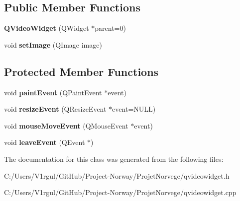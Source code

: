 \subsection*{Public Member Functions}
\begin{DoxyCompactItemize}
\item 
\hypertarget{class_q_video_widget_a9556e8daac0717d705ac8c2fd7e4e2a2}{{\bfseries Q\-Video\-Widget} (Q\-Widget $\ast$parent=0)}\label{class_q_video_widget_a9556e8daac0717d705ac8c2fd7e4e2a2}

\item 
\hypertarget{class_q_video_widget_a331955ccf1e82259702db3fc15983eff}{void {\bfseries set\-Image} (Q\-Image image)}\label{class_q_video_widget_a331955ccf1e82259702db3fc15983eff}

\end{DoxyCompactItemize}
\subsection*{Protected Member Functions}
\begin{DoxyCompactItemize}
\item 
\hypertarget{class_q_video_widget_afa241c4f57f7198f4625b9ac42fbaa79}{void {\bfseries paint\-Event} (Q\-Paint\-Event $\ast$event)}\label{class_q_video_widget_afa241c4f57f7198f4625b9ac42fbaa79}

\item 
\hypertarget{class_q_video_widget_a935858a83ef55740c9424870dc652962}{void {\bfseries resize\-Event} (Q\-Resize\-Event $\ast$event=N\-U\-L\-L)}\label{class_q_video_widget_a935858a83ef55740c9424870dc652962}

\item 
\hypertarget{class_q_video_widget_ab04e47a7d99ee39b6d459bfc94c0b0b0}{void {\bfseries mouse\-Move\-Event} (Q\-Mouse\-Event $\ast$event)}\label{class_q_video_widget_ab04e47a7d99ee39b6d459bfc94c0b0b0}

\item 
\hypertarget{class_q_video_widget_a4c1e806be89ef42a8e5a7771115b886f}{void {\bfseries leave\-Event} (Q\-Event $\ast$)}\label{class_q_video_widget_a4c1e806be89ef42a8e5a7771115b886f}

\end{DoxyCompactItemize}


The documentation for this class was generated from the following files\-:\begin{DoxyCompactItemize}
\item 
C\-:/\-Users/\-V1rgul/\-Git\-Hub/\-Project-\/\-Norway/\-Projet\-Norvege/qvideowidget.\-h\item 
C\-:/\-Users/\-V1rgul/\-Git\-Hub/\-Project-\/\-Norway/\-Projet\-Norvege/qvideowidget.\-cpp\end{DoxyCompactItemize}
